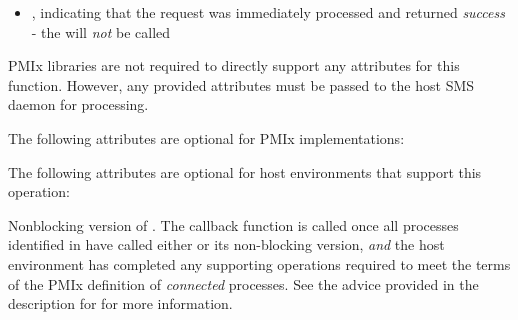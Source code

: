 \format


\begin{arglist}
\end{arglist}

\returnsimplenb

\returnstart
\begin{itemize}
    \item {}, indicating that the request was immediately processed and returned \textit{success} - the  will \textit{not} be called
\end{itemize}
\returnend

\reqattrstart
\ac{PMIx} libraries are not required to directly support any attributes for this function. However, any provided attributes must be passed to the host \ac{SMS} daemon for processing.

\reqattrend

\optattrstart
The following attributes are optional for \ac{PMIx} implementations:



The following attributes are optional for host environments that support this operation:


\optattrend

\descr

Nonblocking version of . The callback function is called once all processes identified in  have called either  or its non-blocking version, \textit{and} the host environment has completed any supporting operations required to meet the terms of the \ac{PMIx} definition of \textit{connected} processes. See the advice provided in the description for  for more information.


